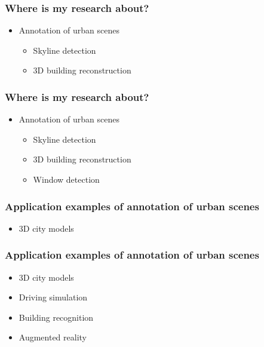 \documentclass{beamer}
\begin{document}
\frame
{
}


\frame
{
	\frametitle{Where is my research about?}
	\begin{itemize}
	\item Annotation of urban scenes
		\begin{itemize}
			\item Skyline detection
			\item <+-| alert@+> 3D building reconstruction
		\end{itemize}
	\end{itemize}
}

\frame
{
}
\frame
{
	\frametitle{Where is my research about?}
	\begin{itemize}
	\item Annotation of urban scenes
		\begin{itemize}
			\item Skyline detection
			\item 3D building reconstruction
			\item <+-| alert@+> Window detection
		\end{itemize}
	\end{itemize}
}
\frame
{
	\frametitle{Application examples of annotation of urban scenes}
	\begin{itemize}
	\item <+-| alert@+> 3D city models
	\end{itemize}
}

\frame
{
}

\frame
{
}

\frame
{
}

\frame
{
}

\frame
{
	\frametitle{Application examples of annotation of urban scenes}
	\begin{itemize}
	\item 3D city models
	\item <+-| alert@+> Driving simulation
	\item <+-| alert@+> Building recognition
	\item <+-| alert@+> Augmented reality
	\end{itemize}
}

\frame
{
}
\frame
{
}
\end{document}
